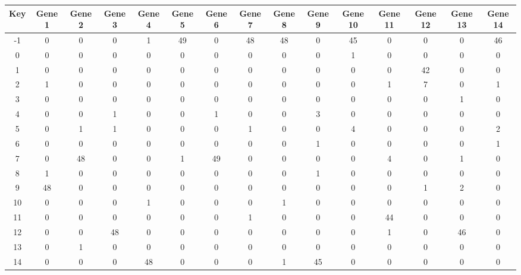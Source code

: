 \begin{tabular}{|c|c|c|c|c|c|c|c|c|c|c|c|c|c|c|}
\hline
Key & Gene 1 & Gene 2 & Gene 3 & Gene 4 & Gene 5 & Gene 6 & Gene 7 & Gene 8 & Gene 9 & Gene 10 & Gene 11 & Gene 12 & Gene 13 & Gene 14 \\
\hline
-1 & 0 & 0 & 0 & 1 & 49 & 0 & 48 & 48 & 0 & 45 & 0 & 0 & 0 & 46 \\
0 & 0 & 0 & 0 & 0 & 0 & 0 & 0 & 0 & 0 & 1 & 0 & 0 & 0 & 0 \\
1 & 0 & 0 & 0 & 0 & 0 & 0 & 0 & 0 & 0 & 0 & 0 & 42 & 0 & 0 \\
2 & 1 & 0 & 0 & 0 & 0 & 0 & 0 & 0 & 0 & 0 & 1 & 7 & 0 & 1 \\
3 & 0 & 0 & 0 & 0 & 0 & 0 & 0 & 0 & 0 & 0 & 0 & 0 & 1 & 0 \\
4 & 0 & 0 & 1 & 0 & 0 & 1 & 0 & 0 & 3 & 0 & 0 & 0 & 0 & 0 \\
5 & 0 & 1 & 1 & 0 & 0 & 0 & 1 & 0 & 0 & 4 & 0 & 0 & 0 & 2 \\
6 & 0 & 0 & 0 & 0 & 0 & 0 & 0 & 0 & 1 & 0 & 0 & 0 & 0 & 1 \\
7 & 0 & 48 & 0 & 0 & 1 & 49 & 0 & 0 & 0 & 0 & 4 & 0 & 1 & 0 \\
8 & 1 & 0 & 0 & 0 & 0 & 0 & 0 & 0 & 1 & 0 & 0 & 0 & 0 & 0 \\
9 & 48 & 0 & 0 & 0 & 0 & 0 & 0 & 0 & 0 & 0 & 0 & 1 & 2 & 0 \\
10 & 0 & 0 & 0 & 1 & 0 & 0 & 0 & 1 & 0 & 0 & 0 & 0 & 0 & 0 \\
11 & 0 & 0 & 0 & 0 & 0 & 0 & 1 & 0 & 0 & 0 & 44 & 0 & 0 & 0 \\
12 & 0 & 0 & 48 & 0 & 0 & 0 & 0 & 0 & 0 & 0 & 1 & 0 & 46 & 0 \\
13 & 0 & 1 & 0 & 0 & 0 & 0 & 0 & 0 & 0 & 0 & 0 & 0 & 0 & 0 \\
14 & 0 & 0 & 0 & 48 & 0 & 0 & 0 & 1 & 45 & 0 & 0 & 0 & 0 & 0 \\
\hline
\end{tabular}